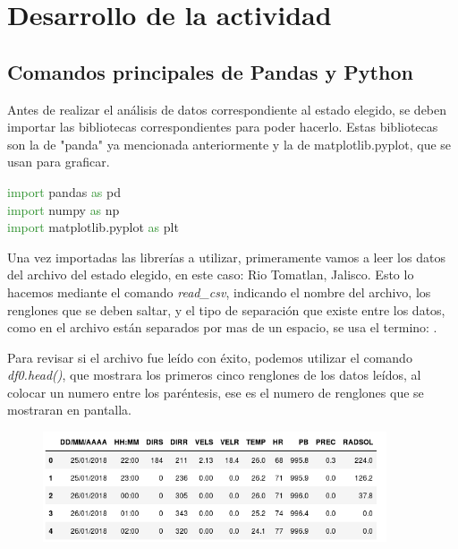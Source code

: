 \documentclass[12pt]{article}
\begin{document}
\section{Desarrollo de la actividad}
\subsection{Comandos principales de Pandas y Python}
Antes de realizar el análisis de datos correspondiente al estado elegido, se deben importar las bibliotecas correspondientes para poder hacerlo. Estas bibliotecas son la de "panda" ya mencionada anteriormente y la de  matplotlib.pyplot, que se usan para graficar.

\begin{center}
\textcolor{ForestGreen} {import} pandas \textcolor{ForestGreen}{as} pd\\
\textcolor{ForestGreen} {import} numpy \textcolor{ForestGreen} {as} np\\
\textcolor{ForestGreen} {import} matplotlib.pyplot \textcolor{ForestGreen} {as} plt
\end{center}
Una vez importadas las librerías a utilizar, primeramente vamos a leer los datos del archivo del estado elegido, en este caso: Rio Tomatlan, Jalisco. Esto lo hacemos mediante el comando \textit{read\_csv}, indicando el nombre del archivo, los renglones que se deben saltar, y el tipo de separación que existe entre los datos, como en el archivo están separados por mas de un espacio, se usa el termino: . 
\begin{center}
\end{center}
Para revisar si el archivo fue leído con éxito, podemos utilizar el comando \textit{df0.head()}, que mostrara los primeros cinco renglones de los datos leídos, al colocar un numero entre los paréntesis, ese es el numero de renglones que se mostraran en pantalla.
\begin{figure}[h]
    \centering
\includegraphics[width=4in]{tabla5ren.png}
\end{figure}
\end{document}

